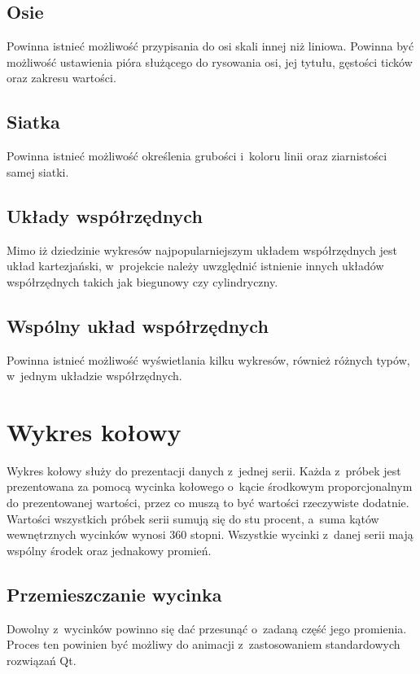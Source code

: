 \subsection{Osie}
Powinna istnieć możliwość przypisania do osi skali innej niż liniowa.
Powinna być możliwość ustawienia pióra służącego do rysowania osi, jej tytułu, gęstości ticków oraz zakresu wartości. 

\subsection{Siatka}
Powinna istnieć możliwość określenia grubości i~koloru linii oraz ziarnistości samej siatki.

\subsection{Układy współrzędnych}
Mimo iż dziedzinie wykresów najpopularniejszym układem współrzędnych jest układ kartezjański, w~projekcie należy uwzględnić istnienie innych układów współrzędnych takich jak biegunowy czy cylindryczny.

\subsection{Wspólny układ współrzędnych}
Powinna istnieć możliwość wyświetlania kilku wykresów, również różnych typów, w~jednym układzie współrzędnych.





\section{Wykres kołowy}
Wykres kołowy służy do prezentacji danych z~jednej serii. Każda z~próbek jest prezentowana za pomocą wycinka kołowego o~kącie środkowym proporcjonalnym do prezentowanej wartości, przez co muszą to być wartości rzeczywiste dodatnie. Wartości wszystkich próbek serii sumują się do stu procent, a~suma kątów wewnętrznych wycinków wynosi 360 stopni. Wszystkie wycinki z~danej serii mają wspólny środek oraz jednakowy promień.

\subsection{Przemieszczanie wycinka}
Dowolny z~wycinków powinno się dać przesunąć o~zadaną część jego promienia. Proces ten powinien być możliwy do animacji z~zastosowaniem standardowych rozwiązań Qt.

